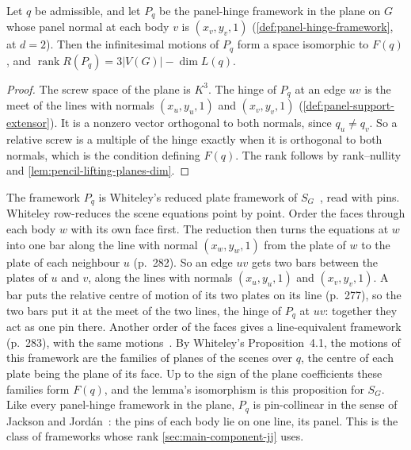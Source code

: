 \begin{lemma}
  \label{lem:pencil-lifting-planes-motions}
  \leanok
  Let $q$ be admissible, and let $P_q$ be the panel-hinge framework in
  the plane on $G$ whose panel normal at each body $v$ is
  $(x_v, y_v, 1)$ (\cref{def:panel-hinge-framework}, at $d = 2$). Then
  the infinitesimal motions of $P_q$ form a space isomorphic to $F(q)$,
  and $\operatorname{rank} R(P_q) = 3|V(G)| - \dim L(q)$.
\end{lemma}
\begin{proof}
  \leanok
  The screw space of the plane is $K^3$. The hinge of $P_q$ at an edge
  $uv$ is the meet of the lines with normals $(x_u, y_u, 1)$ and
  $(x_v, y_v, 1)$ (\cref{def:panel-support-extensor}). It is a nonzero
  vector orthogonal to both normals, since $q_u \ne q_v$. So a relative
  screw is a multiple of the hinge exactly when it is orthogonal to both
  normals, which is the condition defining $F(q)$. The rank follows by
  rank--nullity and \cref{lem:pencil-lifting-planes-dim}.
\end{proof}

The framework $P_q$ is Whiteley's reduced plate framework of
$S_G$~\cite[\S 4.1]{whiteley1984}, read with pins. Whiteley row-reduces
the scene equations point by point. Order the faces through each body
$w$ with its own face first. The reduction then turns the equations at
$w$ into one bar along the line with normal $(x_w, y_w, 1)$ from the
plate of $w$ to the plate of each neighbour $u$ (p.~282). So an edge
$uv$ gets two bars between the plates of $u$ and $v$, along the lines
with normals $(x_u, y_u, 1)$ and $(x_v, y_v, 1)$. A bar puts the
relative centre of motion of its two plates on its line (p.~277), so the
two bars put it at the meet of the two lines, the hinge of $P_q$ at
$uv$: together they act as one pin there. Another order of the faces
gives a line-equivalent framework (p.~283), with the same
motions~\cite[Proposition~3.3]{whiteley1984}. By Whiteley's
Proposition~4.1, the motions of this framework are the families of
planes of the scenes over $q$, the centre of each plate being the plane
of its face. Up to the sign of the plane coefficients these families
form $F(q)$, and the lemma's isomorphism is this proposition for $S_G$.
Like every panel-hinge framework in the plane, $P_q$ is pin-collinear in
the sense of Jackson and Jord\'an~\cite[p.~259]{jacksonJordan2008pin}:
the pins of each body lie on one line, its panel. This is the class of
frameworks whose rank \cref{sec:main-component-jj} uses.

